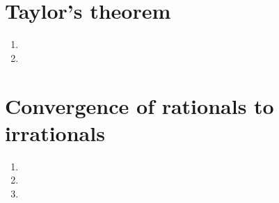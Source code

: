 \documentclass[paper=a4, fontsize=11pt]{scrartcl} %
\numberwithin{equation}{section} %
\numberwithin{figure}{section} %
\numberwithin{table}{section} %
\begin{document}
\section{Taylor's theorem}
	\begin{enumerate}
		\item 

		\item 
		
	\end{enumerate}


\section{Convergence of rationals to irrationals}
	\begin{enumerate}
		\item
	
		\item
		
		\item
		
	\end{enumerate}
\end{document}
